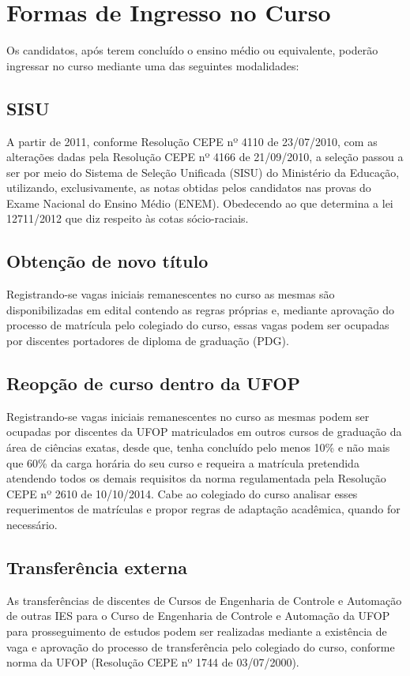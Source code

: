 \documentclass[
	12pt,				%
	openright,			%
	oneside,			%
	a4paper,			%
	english,			%
	brazil				%
	]{abntex2}
\begin{document}
\chapter{Formas de Ingresso no Curso}
Os candidatos, após terem concluído o ensino médio ou equivalente, poderão ingressar no curso mediante uma das seguintes modalidades:

\section{SISU}
A partir de 2011, conforme Resolução CEPE nº 4110 de 23/07/2010, com as alterações dadas pela Resolução CEPE nº 4166 de 21/09/2010, a seleção passou a ser por meio do Sistema de Seleção Unificada (SISU) do Ministério da Educação, utilizando, exclusivamente, as notas obtidas pelos candidatos nas provas do Exame Nacional do Ensino Médio (ENEM). Obedecendo ao que determina a lei 12711/2012 que diz respeito às cotas sócio-raciais.
%
\section{Obtenção de novo título}
Registrando-se vagas iniciais remanescentes no curso as mesmas são disponibilizadas em edital contendo as regras próprias e, mediante aprovação do processo de matrícula pelo colegiado do curso, essas vagas podem ser ocupadas por discentes portadores de diploma de graduação (PDG).
%
\section{Reopção de curso dentro da UFOP}
Registrando-se vagas iniciais remanescentes no curso as mesmas podem ser ocupadas por discentes da UFOP matriculados em outros cursos de graduação da área de ciências exatas, desde que, tenha concluído pelo menos 10\% e não mais que 60\% da carga horária do seu curso e requeira a matrícula pretendida atendendo todos os demais requisitos da norma regulamentada pela Resolução CEPE nº 2610 de 10/10/2014. Cabe ao colegiado do curso analisar esses requerimentos de matrículas e propor regras de adaptação acadêmica, quando for necessário.
%
\section{Transferência externa}
As transferências de discentes de Cursos de Engenharia de Controle e Automação
de outras IES para o Curso de Engenharia de Controle e Automação da UFOP para prosseguimento de estudos podem ser realizadas mediante a existência de vaga e aprovação do processo de transferência pelo colegiado do curso, conforme norma da UFOP (Resolução CEPE nº 1744 de 03/07/2000).
%
\end{document}
